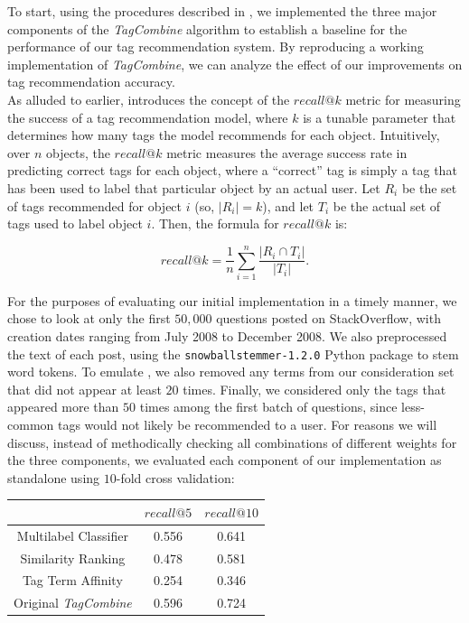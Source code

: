 \documentclass[10pt, final]{article}
\newcommand{\br}[1][.75]{\ \\[#1\baselineskip]}
\begin{document}
To start, using the procedures described in \cite{1}, we implemented the three major components of the \textit{TagCombine} algorithm to establish a baseline for the performance of our tag recommendation system. By reproducing a working implementation of \textit{TagCombine}, we can analyze the effect of our improvements on tag recommendation accuracy.\br
As alluded to earlier, \cite{1} introduces the concept of the $recall@k$ metric for measuring the success of a tag recommendation model, where $k$ is a tunable parameter that determines how many tags the model recommends for each object. Intuitively, over $n$ objects, the $recall@k$ metric measures the average success rate in predicting correct tags for each object, where a ``correct'' tag is simply a tag that has been used to label that particular object by an actual user. Let $R_i$ be the set of tags recommended for object $i$ (so, $|R_i| = k$), and let $T_i$ be the actual set of tags used to label object $i$. Then, the formula for $recall@k$ is:

\[recall@k = \frac{1}{n}\sum\limits_{i=1}^{n}\frac{|R_i \cap T_i|}{|T_i|}.\]

For the purposes of evaluating our initial implementation in a timely manner, we chose to look at only the first $50,000$ questions posted on StackOverflow, with creation dates ranging from July 2008 to December 2008. We also preprocessed the text of each post, using the \texttt{snowballstemmer-1.2.0} Python package to stem word tokens. To emulate \cite{1}, we also removed any terms from our consideration set that did not appear at least $20$ times. Finally, we considered only the tags that appeared more than $50$ times among the first batch of questions, since less-common tags would not likely be recommended to a user. For reasons we will discuss, instead of methodically checking all combinations of different weights for the three components, we evaluated each component of our implementation as standalone using $10$-fold cross validation:

\begin{center}\begin{tabular}{c||c|c}
& $recall@5$ & $recall@10$\\ \hline\hline
Multilabel Classifier & 0.556 & 0.641\\ \hline
Similarity Ranking & 0.478 & 0.581\\ \hline
Tag Term Affinity & 0.254 & 0.346\\ \hline\hline
\cite{1} Original \textit{TagCombine} & 0.596 & 0.724\\
\end{tabular}\end{center}
\end{document}
